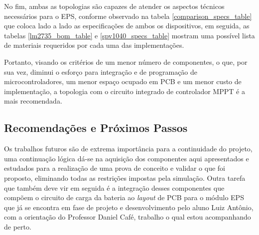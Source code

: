 



No fim, ambas as topologias são capazes de atender os aspectos técnicos necessários para o EPS, conforme observado na tabela \ref{comparison_specs_table} que coloca lado a lado as especificações de ambos os dispositivos, em seguida, as tabelas \ref{lm2735_bom_table} e \ref{spv1040_specs_table} mostram uma possível lista de materiais requeridos por cada uma das implementações.



Portanto, visando os critérios de um menor número de componentes, o que, por sua vez, diminui o esforço para integração e de programação de microcontroladores, um menor espaço ocupado em PCB e um menor custo de implementação, a topologia com o circuito integrado de controlador MPPT é a mais recomendada.

\subsection*{Recomendações e Próximos Passos}

Os trabalhos futuros são de extrema importância para a continuidade do projeto, uma continuação lógica dá-se na aquisição dos componentes aqui apresentados e estudados para a realização de uma prova de conceito e validar o que foi proposto, eliminando todas as restrições impostas pela simulação. Outra tarefa que também deve vir em seguida é a integração desses componentes que compõem o circuito de carga da bateria ao \textit{layout} de PCB para o módulo EPS que já se encontra em fase de projeto e desenvolvimento pelo aluno Luiz Antônio, com a orientação do Professor Daniel Café, trabalho o qual estou acompanhando de perto.

